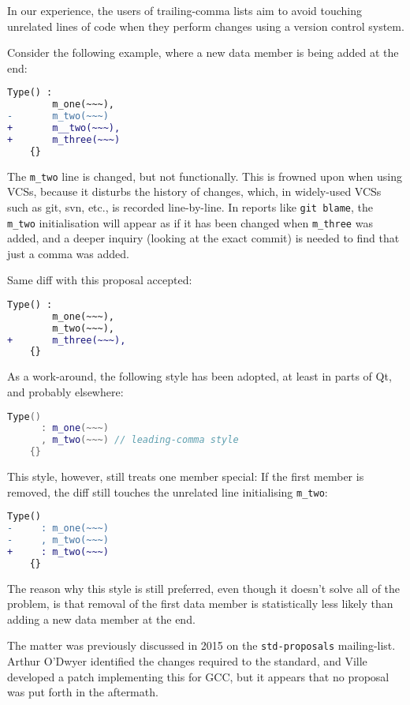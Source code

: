 \documentclass[11pt]{article}
\begin{document}
In our experience, the users of trailing-comma lists aim to avoid
touching unrelated lines of code when they perform changes using a
version control system.

Consider the following example, where a new data member is being added
at the end:

\begin{lstlisting}[language=diff]
    Type() :
        m_one(~~~),
-       m_two(~~~)
+       m__two(~~~),
+       m_three(~~~)
    {}
\end{lstlisting}

The \texttt{m\_two} line is changed, but not functionally. This is
frowned upon when using VCSs, because it disturbs the history of
changes, which, in widely-used VCSs such as git, svn, etc., is
recorded line-by-line. In reports like \texttt{git blame}, the
\texttt{m\_two} initialisation will appear as if it has been changed
when \texttt{m\_three} was added, and a deeper inquiry (looking at the
exact commit) is needed to find that just a comma was added.

Same diff with this proposal accepted:

\begin{lstlisting}[language=diff]
    Type() :
        m_one(~~~),
        m_two(~~~),
+       m_three(~~~),
    {}
\end{lstlisting}

As a work-around, the following style has been adopted, at least in
parts of Qt, and probably elsewhere:

\begin{lstlisting}[language=C++]
    Type()
      : m_one(~~~)
      , m_two(~~~) // leading-comma style
    {}
\end{lstlisting}

This style, however, still treats one member special: If the first
member is removed, the diff still touches the unrelated line
initialising \texttt{m\_two}:

\begin{lstlisting}[language=diff]
    Type()
-     : m_one(~~~)
-     , m_two(~~~)
+     : m_two(~~~)
    {}
\end{lstlisting}

The reason why this style is still preferred, even though it doesn't
solve all of the problem, is that removal of the first data member is
statistically less likely than adding a new data member at the end.

The matter was previously discussed in 2015 on the
\texttt{std-proposals} mailing-list\cite{mld}. Arthur O'Dwyer
identified the changes required to the standard\cite{std}, and Ville
developed a patch implementing this for GCC\cite{GCC}, but it appears
that no proposal was put forth in the aftermath.
\end{document}
